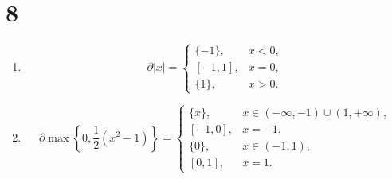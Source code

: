 \section*{8}

\begin{enumerate}[label=\alph*)]
    \item
        \begin{equation*}
            \partial|x|=
            \begin{cases}
                \{-1\}, &x<0, \\
                [-1,1], &x=0, \\
                \{1\}, &x>0.
            \end{cases}
        \end{equation*}
    \item
        \begin{equation*}
            \partial\max\left\{0, \frac{1}{2}\left(x^2-1\right)\right\}=
            \begin{cases}
                \{x\}, &x\in(-\infty, -1)\cup(1,+\infty), \\
                [-1,0], &x=-1, \\
                \{0\}, &x\in(-1,1), \\
                [0,1], &x=1.
            \end{cases}
        \end{equation*}
\end{enumerate}

